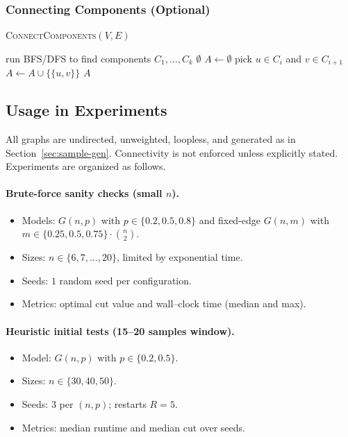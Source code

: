 \documentclass[12pt]{article}
\begin{document}
\subsubsection{Connecting Components (Optional)}
\begin{algorithm}[H]
\caption{\textsc{ConnectComponents}$(V,E)$}
\begin{algorithmic}[1]
\State run BFS/DFS to find components \(C_1,\dots,C_k\)
 \Return \(\emptyset\) \EndIf
\State \(A \gets \emptyset\)
  \State pick \(u \in C_i\) and \(v \in C_{i+1}\)
  \State \(A \gets A \cup \{\{u,v\}\}\)
\EndFor
\State \Return \(A\)
\end{algorithmic}
\end{algorithm}

\subsection{Usage in Experiments}
All graphs are undirected, unweighted, loopless, and generated as in Section~\ref{sec:sample-gen}. Connectivity is not enforced unless explicitly stated. Experiments are organized as follows.

\paragraph{Brute-force sanity checks (small $n$).}
\begin{itemize}
  \item Models: $G(n,p)$ with $p\in\{0.2,0.5,0.8\}$ and fixed-edge $G(n,m)$ with $m\in\{0.25,0.5,0.75\}\cdot\binom{n}{2}$.
  \item Sizes: $n\in\{6,7,\dots,20\}$, limited by exponential time.
  \item Seeds: $1$ random seed per configuration.
  \item Metrics: optimal cut value and wall–clock time (median and max).
\end{itemize}

\paragraph{Heuristic initial tests (15--20 samples window).}
\begin{itemize}
  \item Model: $G(n,p)$ with $p\in\{0.2,0.5\}$.
  \item Sizes: $n\in\{30,40,50\}$.
  \item Seeds: $3$ per $(n,p)$; restarts $R=5$.
  \item Metrics: median runtime and median cut over seeds.
\end{itemize}
\end{document}
